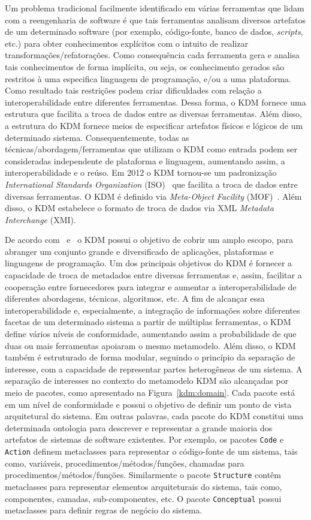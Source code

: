 \documentclass[12pt]{article}
\begin{document}
Um problema tradicional facilmente identificado em várias ferramentas que lidam com a reengenharia de software é que tais ferramentas analisam diversos artefatos de um determinado software (por exemplo, código-fonte, banco de dados, \textit{scripts}, etc.) para obter conhecimentos explícitos com o intuito de realizar transformações/refatorações. Como consequência cada ferramenta gera e analisa tais conhecimentos de forma implícita, ou seja, os conhecimento gerados são restritos à uma especifica linguagem de programação, e/ou a uma plataforma. Como resultado tais restrições podem criar dificuldades com relação a interoperabilidade entre diferentes ferramentas. Dessa forma, o KDM fornece uma estrutura que facilita a troca de dados entre as diversas ferramentas. Além disso, a estrutura do KDM fornece meios de especificar artefatos físicos e lógicos de um determinado sistema. Consequentemente, todas as técnicas/abordagem/ferramentas que utilizam o KDM como entrada podem ser consideradas independente de plataforma e linguagem, aumentando assim, a interoperabilidade e o reúso. Em 2012 o KDM tornou-se um padronização \textit{International Standards Organization} (ISO)~\cite{KDM:specification} que facilita a troca de dados entre diversas ferramentas. O KDM é definido via \textit{Meta-Object Facility} (MOF)~\cite{MOF}. Além disso, o KDM estabelece o formato de troca de dados via XML \textit{Metadata Interchange} (XMI).


De acordo com~\cite{KDM:specification} e~\cite{PerezCastillo:2011jo} o KDM possui o objetivo de cobrir um amplo escopo, para abranger um conjunto grande e diversificado de aplicações, plataformas e linguagens de programação. Um dos principais objetivos do KDM é fornecer a capacidade de troca de metadados entre diversas ferramentas e, assim, facilitar a cooperação entre fornecedores para integrar e aumentar a interoperabilidade de diferentes abordagens, técnicas, algoritmos, etc. A fim de alcançar essa interoperabilidade e, especialmente, a integração de informações sobre diferentes facetas de um determinado sistema a partir de múltiplas ferramentas, o KDM define vários níveis de conformidade, aumentando assim a probabilidade de que duas ou mais ferramentas apoiaram o mesmo metamodelo. Além disso, o KDM também é estruturado de forma modular, seguindo o princípio da separação de interesse, com a capacidade de representar partes heterogêneas de um sistema. A separação de interesses no contexto do metamodelo KDM são alcançadas por meio de pacotes, como apresentado na Figura~\ref{kdm:domain}. Cada pacote está em um nível de conformidade e possui o objetivo de definir um ponto de vista arquitetural do sistema. Em outras palavras, cada pacote do KDM constitui uma determinada ontologia para descrever e representar a grande maioria dos artefatos de sistemas de software existentes. Por exemplo, os pacotes \texttt{Code} e \texttt{Action} definem metaclasses para representar o código-fonte de um sistema, tais como, variáveis, procedimentos/métodos/funções, chamadas para procedimentos/métodos/funções. Similarmente o pacote \texttt{Structure} contêm metaclasses para representar elementos arquiteturais do sistema, tais como, componentes, camadas, sub-componentes, etc. O pacote \texttt{Conceptual} possui  metaclasses para definir regras de negócio do sistema.
\end{document}
